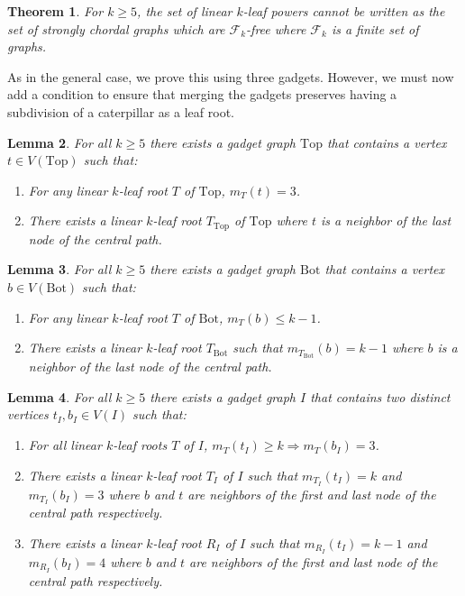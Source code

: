 \documentclass[11pt,letter]{article}
\newtheorem{theorem}{Theorem}[section]
\newtheorem{lemma}[theorem]{Lemma}
\theoremstyle{remark}
\newcommand{\T}{\text{Top}}
\newcommand{\B}{\text{Bot}}
\newcommand{\F}{\mathscr{F}}
\begin{document}
\begin{theorem}\label{thm:caterpillar}
    For $k\geq 5$, the set of linear $k$-leaf powers cannot be written as the set of strongly chordal graphs which are $\F_k$-free where $\F_k$ is a finite set of graphs.
\end{theorem}

As in the general case, we prove this using three gadgets. However, we must now add a condition to ensure that merging the gadgets preserves having a subdivision of a caterpillar as a leaf root.

\begin{lemma}\label{lem:top-caterpillar}
For all $k\geq 5$ there exists a gadget graph $\T$ that contains a vertex $t\in V(\T)$ such that:
\begin{enumerate}
        \item For any linear $k$-leaf root $T$ of $\T$, $m_{T}(t) = 3$.
        \item There exists a linear $k$-leaf root $T_{\T}$ of  $\T$ where $t$ is a neighbor of the last node of the central path.
    \end{enumerate}
\end{lemma}

\begin{lemma}\label{lem:bottom-caterpillar}
For all $k\geq 5$ there exists a gadget graph $\B$ that contains a vertex $b \in V(\B)$ such that:
\begin{enumerate}
        \item For any linear $k$-leaf root $T$ of $\B$, $m_T(b) \leq k-1$.
        \item There exists a linear $k$-leaf root $T_{\B}$ such that $m_{T_{\B}}(b) = k-1$ where $b$ is a neighbor of the last node of the central path.
\end{enumerate}
\end{lemma}

\begin{lemma}\label{lem:induction-caterpillar}
For all $k\geq 5$ there exists a gadget graph $I$ that contains two distinct vertices $t_I,b_I\in V(I)$ such that:
\begin{enumerate}
        \item For all linear $k$-leaf roots $T$ of $I$, $m_T(t_I)\geq k\Longrightarrow m_T(b_I)=3$.
        \item There exists a linear $k$-leaf root $T_I$ of $I$ such that $m_{T_I}(t_I)=k$ and $m_{T_I}(b_I)=3$ where $b$ and $t$ are neighbors of the first and last node of the central path respectively.
        \item There exists a linear $k$-leaf root $R_I$ of $I$ such that $m_{R_I}(t_I)=k-1$ and $m_{R_I}(b_I)=4$ where $b$ and $t$ are neighbors of the first and last node of the central path respectively.
    \end{enumerate}    
\end{lemma}
\end{document}
